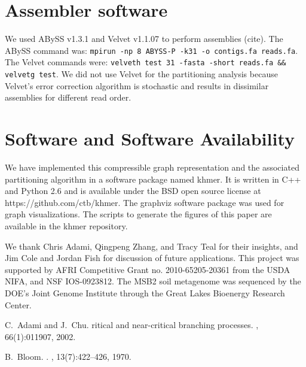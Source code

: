 \documentclass{pnastwo}
\begin{document}
\begin{article}
\begin{materials}
\section{Assembler software}

We used ABySS v1.3.1 and Velvet v1.1.07 to perform assemblies (cite).
The ABySS command was: {\tt mpirun -np 8 ABYSS-P -k31 -o contigs.fa reads.fa}.
The Velvet commands were: {\tt velveth test 31 -fasta -short reads.fa \&\& velvetg test}.
We did not use Velvet for the partitioning analysis because Velvet's
error correction algorithm is stochastic and results in dissimilar
assemblies for different read order.

\section{Software and Software Availability}

We have implemented this compressible graph representation and the associated
partitioning algorithm in a
software package named khmer.  It is written in C++ and Python 2.6 and
is available under the BSD open source license at
https://github.com/ctb/khmer.  The graphviz software package was used
for graph visualizations. The scripts to generate the figures of this
paper are available in the khmer repository.

\end{materials}

\begin{acknowledgments}

We thank Chris Adami, Qingpeng Zhang, and Tracy Teal for
their insights, and Jim Cole and Jordan Fish for discussion of future
applications.  This project was supported by AFRI Competitive Grant
no. 2010-65205-20361 from the USDA NIFA, and NSF IOS-0923812.  The
MSB2 soil metagenome was sequenced by the DOE's Joint Genome
Institute through the Great Lakes Bioenergy Research Center.

\end{acknowledgments}




\begin{thebibliography}{10}

C.~Adami and J.~Chu.
ritical and near-critical branching processes.
, 66(1):011907, 2002.

B.~Bloom.
.
, 13(7):422--426, 1970.


\end{thebibliography}
\end{article}
\end{document}
